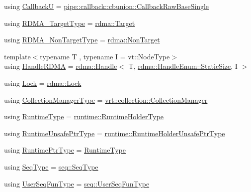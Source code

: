 \begin{DoxyCompactItemize}
\item 
using \hyperlink{namespacevt_af79a43a97bc3593fc349f086c874c48e}{CallbackU} = \hyperlink{structvt_1_1pipe_1_1callback_1_1cbunion_1_1_callback_raw_base_single}{pipe\+::callback\+::cbunion\+::\+Callback\+Raw\+Base\+Single}
\item 
using \hyperlink{namespacevt_a9bf03a57102d0274cc229b9ef94bb59e}{R\+D\+M\+A\+\_\+\+Target\+Type} = \hyperlink{structvt_1_1rdma_1_1_target}{rdma\+::\+Target}
\item 
using \hyperlink{namespacevt_ae5bd2866e5ee83f4d6a53e8730cd3202}{R\+D\+M\+A\+\_\+\+Non\+Target\+Type} = \hyperlink{structvt_1_1rdma_1_1_non_target}{rdma\+::\+Non\+Target}
\item 
{\footnotesize template$<$typename T , typename I  = vt\+::\+Node\+Type$>$ }\\using \hyperlink{namespacevt_abc3449a4b87363b942453d0b8cc18a7d}{Handle\+R\+D\+MA} = \hyperlink{structvt_1_1rdma_1_1_handle}{rdma\+::\+Handle}$<$ T, \hyperlink{namespacevt_1_1rdma_a0234ff19cfb3c04718cfdfd36b2d6d88a0c5c41d6a0319a61d3a5e8a060b7c4d7}{rdma\+::\+Handle\+Enum\+::\+Static\+Size}, I $>$
\item 
using \hyperlink{namespacevt_ae3eb725d1ffe20cd7d82a8c42f3e52ef}{Lock} = \hyperlink{namespacevt_1_1rdma_ac5c20b41a653e520b6305d4d454ecb70}{rdma\+::\+Lock}
\item 
using \hyperlink{namespacevt_a290f7e8941f9f411b54cdb15b6cea107}{Collection\+Manager\+Type} = \hyperlink{structvt_1_1vrt_1_1collection_1_1_collection_manager}{vrt\+::collection\+::\+Collection\+Manager}
\item 
using \hyperlink{namespacevt_a5c1db2c048b259a2ba8961766ddb9278}{Runtime\+Type} = \hyperlink{namespacevt_1_1runtime_ab09d044cce417fbcdb7e1e29b7aabbc3}{runtime\+::\+Runtime\+Holder\+Type}
\item 
using \hyperlink{namespacevt_a8019b70cc4b9b0833c38559c85dfd53b}{Runtime\+Unsafe\+Ptr\+Type} = \hyperlink{namespacevt_1_1runtime_a69931905b04961a874e4a70a43083a83}{runtime\+::\+Runtime\+Holder\+Unsafe\+Ptr\+Type}
\item 
using \hyperlink{namespacevt_a0ce60e0299d8fa32223b3b9ffa0af466}{Runtime\+Ptr\+Type} = \hyperlink{namespacevt_a5c1db2c048b259a2ba8961766ddb9278}{Runtime\+Type}
\item 
using \hyperlink{namespacevt_a98ecd5e376bd317a21b245064361240e}{Seq\+Type} = \hyperlink{namespacevt_1_1seq_a3b612da217ac669d39c159f134ab8434}{seq\+::\+Seq\+Type}
\item 
using \hyperlink{namespacevt_affe11140b7cc6953030f1f158b40750c}{User\+Seq\+Fun\+Type} = \hyperlink{namespacevt_1_1seq_aeb4674d25dcb5d27248b68ec83fad2b6}{seq\+::\+User\+Seq\+Fun\+Type}

\end{DoxyCompactItemize}
